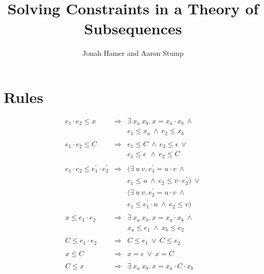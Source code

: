 \documentclass{article}
\begin{document}
\newcommand{\interp}[1]{\llbracket #1 \rrbracket} 
\newtheorem{theorem}{Theorem}
\newtheorem{lemma}[theorem]{Lemma}
\newtheorem{definition}[theorem]{Definition}

\title{Solving Constraints in a Theory of Subsequences}

\author{Jonah Hamer and Aaron Stump}

\maketitle

\section{Rules}

\[
\begin{array}{lll}

  e_1 \cdot e_2 \le x   &   \Longrightarrow  &  \exists\ x_a\ x_b.\ x = x_a \cdot x_b\ \wedge \\
  \ & \ & e_1 \le x_a\ \wedge\ e_2 \le x_b \\
  
  \ & \ & \ \\
  
  e_1 \cdot e_2 \le C   &   \Longrightarrow  &  e_1 \le C\ \wedge\ e_2 \le \epsilon\ \vee \\
  \ & \ & e_1 \le \epsilon\ \ \wedge\ e_2 \le C \\
  
  \ & \ & \ \\
  
  e_1 \cdot e_2 \le e_1^\prime \cdot e_2^\prime   &   \Longrightarrow  &  (\exists\ u\ v.\ e_1^\prime = u \cdot v\ \wedge \\
  \ & \ & e_1 \le u\ \wedge\ e_2 \le v \cdot e_2^\prime)\ \vee \\
  \ & \ & (\exists\ u\ v.\ e_2^\prime = u \cdot v\ \wedge \\
  \ & \ & e_1 \le e_1^\prime \cdot u\ \wedge\ e_2 \le v) \\
  
  \ & \ & \ \\
  
  x \le e_1 \cdot e_2   &   \Longrightarrow  &  \exists\ x_a\ x_b.\ x = x_a \cdot x_b\ \wedge \\
  \ & \ & x_a \le e_1\ \wedge\ x_b \le e_2 \\
  
  \ & \ & \ \\
  
  C \le e_1 \cdot e_2   &   \Longrightarrow  &  C \le e_1\ \vee\ C \le e_2 \\
  
  \ & \ & \ \\
  
  x \le C   &   \Longrightarrow  &  x = \epsilon\ \vee\ x = C \\
  
  \ & \ & \ \\
  
  C \le x   &   \Longrightarrow  &  \exists\ x_a\ x_b.\ x = x_a \cdot C \cdot x_b \\
\end{array}
\]
  

%
%
\end{document}
